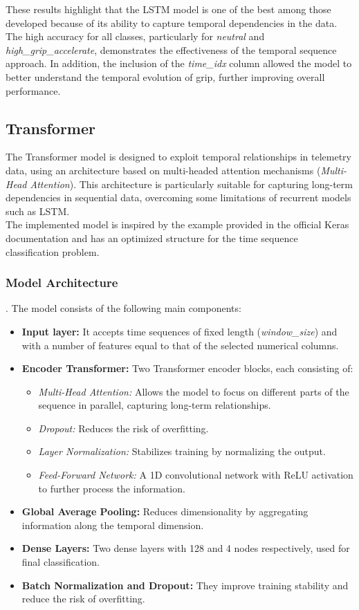 \documentclass[a4paper,final,12pt]{report}
\begin{document}
These results highlight that the LSTM model is one of the best among those developed because of its ability to capture temporal dependencies in the data. The high accuracy for all classes, particularly for \textit{neutral} and \textit{high\_grip\_accelerate}, demonstrates the effectiveness of the temporal sequence approach. In addition, the inclusion of the \textit{time\_idx} column allowed the model to better understand the temporal evolution of grip, further improving overall performance.


\subsection{Transformer}
The Transformer model is designed to exploit temporal relationships in telemetry data, using an architecture based on multi-headed attention mechanisms (\textit{Multi-Head Attention}). This architecture is particularly suitable for capturing long-term dependencies in sequential data, overcoming some limitations of recurrent models such as LSTM.\\

The implemented model is inspired by the example provided in the official Keras documentation \cite{keras_transformer_example} and has an optimized structure for the time sequence classification problem.

\subsubsection{Model Architecture}.
The model consists of the following main components:
\begin{itemize}
    \item \textbf{Input layer:} It accepts time sequences of fixed length (\textit{window\_size}) and with a number of features equal to that of the selected numerical columns.
    \item \textbf{Encoder Transformer:} Two Transformer encoder blocks, each consisting of:
    \begin{itemize}
        \item \textit{Multi-Head Attention:} Allows the model to focus on different parts of the sequence in parallel, capturing long-term relationships.
        \item \textit{Dropout:} Reduces the risk of overfitting.
        \item \textit{Layer Normalization:} Stabilizes training by normalizing the output.
        \item \textit{Feed-Forward Network:} A 1D convolutional network with ReLU activation to further process the information.
    \end{itemize}
    \item \textbf{Global Average Pooling:} Reduces dimensionality by aggregating information along the temporal dimension.
    \item \textbf{Dense Layers:} Two dense layers with 128 and 4 nodes respectively, used for final classification.
    \item \textbf{Batch Normalization and Dropout:} They improve training stability and reduce the risk of overfitting.
\end{itemize}
\end{document}
